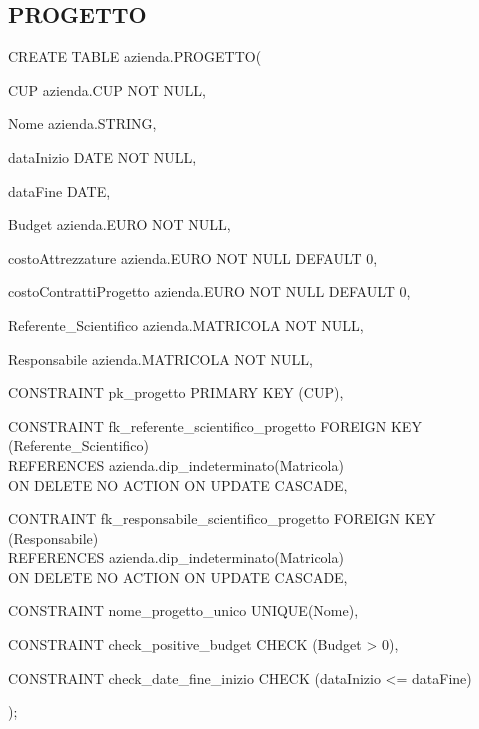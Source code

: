         \subsection{PROGETTO}
            \ttfamily
                \begin{flushleft}
                    \begin{description}
                        \item CREATE TABLE azienda.PROGETTO(                
                        \begin{description}
                            \item CUP azienda.CUP NOT NULL,
                            \item Nome azienda.STRING,
                            \item dataInizio DATE NOT NULL,
                            \item dataFine DATE,
                            \item Budget azienda.EURO NOT NULL,
                            \item costoAttrezzature azienda.EURO NOT NULL DEFAULT 0,
                            \item costoContrattiProgetto azienda.EURO NOT NULL DEFAULT 0,
                            \item Referente\_Scientifico azienda.MATRICOLA NOT NULL,
                            \item Responsabile azienda.MATRICOLA NOT NULL,
                            
                            \vspace{0.5cm}

                            \item CONSTRAINT pk\_progetto PRIMARY KEY (CUP),
                            \item CONSTRAINT fk\_referente\_scientifico\_progetto FOREIGN KEY (Referente\_Scientifico)\\
                            REFERENCES azienda.dip\_indeterminato(Matricola)\\
                            ON DELETE NO ACTION		ON UPDATE CASCADE,
                            \item CONTRAINT fk\_responsabile\_scientifico\_progetto FOREIGN KEY (Responsabile)\\
                            REFERENCES azienda.dip\_indeterminato(Matricola)\\
                            ON DELETE NO ACTION		ON UPDATE CASCADE,
                            \item CONSTRAINT nome\_progetto\_unico UNIQUE(Nome),
                            \item CONSTRAINT check\_positive\_budget CHECK (Budget > 0),
                            \item CONSTRAINT check\_date\_fine\_inizio CHECK (dataInizio <= dataFine)
                        \end{description}
                        );
                    \end{description}
                \end{flushleft}
            \normalfont

